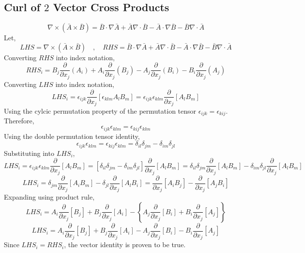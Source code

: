 \subsection{Curl of $2$ Vector Cross Products}
\begin{comment}
\end{comment}
$$\nabla\times (\bar{A}\times \bar{B}) = \bar{B}\cdot\nabla \bar{A} + \bar{A}\nabla\cdot\bar{B} - \bar{A}\cdot\nabla \bar{B} - \bar{B}\nabla\cdot\bar{A}$$
Let,
$$LHS = \nabla\times (\bar{A}\times \bar{B}) \quad,\quad RHS = \bar{B}\cdot\nabla \bar{A} + \bar{A}\nabla\cdot\bar{B} - \bar{A}\cdot\nabla \bar{B} - \bar{B}\nabla\cdot\bar{A}$$
Converting $RHS$ into index notation,
$$RHS_i = B_j \frac{\partial }{\partial x_j}(A_i) + A_i \frac{\partial}{\partial x_j}(B_j) - A_j\frac{\partial}{\partial x_j}(B_i) - B_i\frac{\partial}{\partial x_j}(A_j)$$
Converting $LHS$ into index notation,
$$LHS_i = \epsilon_{ijk} \frac{\partial}{\partial x_j}\left[\epsilon_{klm} A_l B_m\right] = \epsilon_{ijk}\epsilon_{klm} \frac{\partial}{\partial x_j}\left[ A_l B_m\right]$$
Using the cylcic permutation property of the permutation tensor $\epsilon_{ijk} = \epsilon_{kij}$. Therefore,
$$\epsilon_{ijk}\epsilon_{klm} = \epsilon_{kij}\epsilon_{klm}$$
Using the double permutation tensor identity,
$$\epsilon_{ijk}\epsilon_{klm} = \epsilon_{kij}\epsilon_{klm} = \delta_{il}\delta_{jm} - \delta_{im}\delta_{jl}$$
Substituting into $LHS_i$,
$$LHS_i = \epsilon_{ijk}\epsilon_{klm} \frac{\partial}{\partial x_j}\left[ A_l B_m\right] = \left[\delta_{il}\delta_{jm} - \delta_{im}\delta_{jl}\right]\frac{\partial}{\partial x_j}\left[ A_l B_m\right] = \delta_{il}\delta_{jm}\frac{\partial}{\partial x_j}\left[ A_l B_m\right] - \delta_{im}\delta_{jl}\frac{\partial}{\partial x_j}\left[ A_l B_m\right]$$
$$LHS_i = \delta_{jm}\frac{\partial}{\partial x_j}\left[ A_i B_m\right] - \delta_{jl}\frac{\partial}{\partial x_j}\left[ A_l B_i\right] = \frac{\partial}{\partial x_j}\left[ A_i B_j\right] - \frac{\partial}{\partial x_j}\left[ A_j B_i\right]$$
Expanding using product rule,
$$LHS_i = A_i\frac{\partial}{\partial x_j}\left[B_j\right] + B_j\frac{\partial}{\partial x_j}\left[A_i\right] - \left\{A_j\frac{\partial}{\partial x_j}\left[B_i\right] + B_i\frac{\partial}{\partial x_j}\left[ A_j\right]\right\}$$
$$LHS_i = A_i\frac{\partial}{\partial x_j}\left[B_j\right] + B_j\frac{\partial}{\partial x_j}\left[A_i\right] - A_j\frac{\partial}{\partial x_j}\left[B_i\right] - B_i\frac{\partial}{\partial x_j}\left[ A_j\right]$$
Since $LHS_i = RHS_i$, the vector identity is proven to be true.
